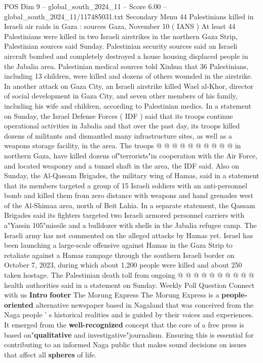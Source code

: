 \begin{textsample}{POS Dim 9 – global\_south\_2024\_11 – Score 6.00 – global\_south\_2024\_11/117485031.txt}  \label{ex:f9_pos_141}
Secondary Menu 44 Palestinians killed in Israeli air raids in Gaza : sources Gaza, November 10 ( IANS ) At least 44 Palestinians were killed in two Israeli airstrikes in the northern Gaza Strip, Palestinian sources said Sunday.
Palestinian security sources said an Israeli aircraft bombed and completely destroyed a house housing displaced people in the Jabalia area.
Palestinian medical sources told Xinhua that 36 Palestinians, including 13 children, were killed and dozens of others wounded in the airstrike.
In another attack on Gaza City, an Israeli airstrike killed Wael al-Khor, director of social development in Gaza City, and seven other members of his family, including his wife and children, according to Palestinian medics.
In a statement on Sunday, the Israel Defense Forces ( IDF ) said that its troops continue operational activities in Jabalia and that over the past day, its troops killed dozens of militants and dismantled many infrastructure sites, as well as a weapons storage facility, in the area.
The troops @ @ @ @ @ @ @ @ @ @ in northern Gaza, have killed dozens of"terrorists"in cooperation with the Air Force, and located weaponry and a tunnel shaft in the area, the IDF said.
Also on Sunday, the Al-Qassam Brigades, the military wing of Hamas, said in a statement that its members targeted a group of 15 Israeli soldiers with an anti-personnel bomb and killed them from zero distance with weapons and hand grenades west of the Al-Shimaa area, north of Beit Lahia.
In a separate statement, the Qassam Brigades said its fighters targeted two Israeli armored personnel carriers with a"Yassin 105"missile and a bulldozer with shells in the Jabalia refugee camp.
The Israeli army has not commented on the alleged attacks by Hamas yet.
Israel has been launching a large-scale offensive against Hamas in the Gaza Strip to retaliate against a Hamas rampage through the southern Israeli border on October 7, 2023, during which about 1,200 people were killed and about 250 taken hostage.
The Palestinian death toll from ongoing @ @ @ @ @ @ @ @ @ @ health authorities said in a statement on Sunday.
Weekly Poll Question Connect with us \textbf{Intro} \textbf{footer} The Morung Express The Morung Express is a \textbf{people-oriented} alternative newspaper based in Nagaland that was conceived from the Naga people ' s historical realities and is guided by their voices and experiences.
It emerged from the \textbf{well-recognized} concept that the core of a free press is based on"\textbf{qualitative} and investigative"journalism.
Ensuring this is essential for contributing to an informed Naga public that makes sound decisions on issues that affect all \textbf{spheres} of life.

\end{textsample}
